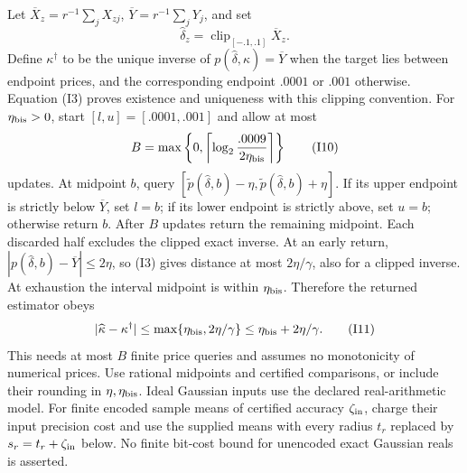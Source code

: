 \documentclass[11pt,a4paper]{article}
\begin{document}
Let $\overline X_z=r^{-1}\sum_jX_{zj}$, $\overline Y=r^{-1}\sum_jY_j$, and set
\[
 \widehat\delta_z=\operatorname{clip}_{[-.1,.1]}\overline X_z. \tag{I9}
\]
Define $\kappa^\dagger$ to be the unique inverse of
$p(\widehat\delta,\kappa)=\overline Y$ when the target lies between endpoint
prices, and the corresponding endpoint $.0001$ or $.001$ otherwise.
Equation \textup{(I3)} proves existence and uniqueness with this clipping convention.
For $\eta_{\rm bis}>0$, start $[l,u]=[.0001,.001]$ and allow at most
\[
 B=\max\left\{0,\left\lceil\log_2\frac{.0009}{2\eta_{\rm bis}}\right\rceil\right\}
                                                                    \tag{I10}
\]
updates. At midpoint $b$, query $[\widetilde p(\widehat\delta,b)-\eta,
\widetilde p(\widehat\delta,b)+\eta]$. If its upper endpoint is strictly below
$\overline Y$, set $l=b$; if its lower endpoint is strictly above, set $u=b$;
otherwise return $b$. After $B$ updates return the remaining midpoint.
Each discarded half excludes the clipped exact inverse. At an early return,
$|p(\widehat\delta,b)-\overline Y|\leq2\eta$, so \textup{(I3)} gives
distance at most $2\eta/\gamma$, also for a clipped inverse. At exhaustion the
interval midpoint is within $\eta_{\rm bis}$. Therefore the returned estimator obeys
\[
 |\widehat\kappa-\kappa^\dagger|\leq\max\{\eta_{\rm bis},2\eta/\gamma\}
 \leq\eta_{\rm bis}+2\eta/\gamma.                                    \tag{I11}
\]
This needs at most $B$ finite price queries and assumes no monotonicity of
numerical prices. Use rational midpoints and certified comparisons, or
include their rounding in $\eta,\eta_{\rm bis}$. Ideal Gaussian inputs use the declared
real-arithmetic model. For finite encoded sample means of certified accuracy
$\zeta_{\rm in}$, charge their input precision cost and use the supplied
means with every radius $t_r$ replaced by $s_r=t_r+\zeta_{\rm in}$ below.
No finite bit-cost bound for unencoded exact Gaussian reals is asserted.
\end{document}
